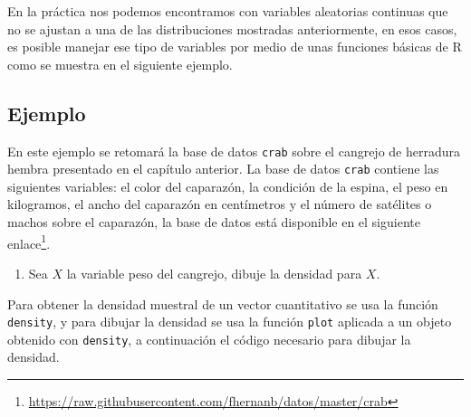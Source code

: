 \documentclass[10pt,]{krantz}
\makeatletter
\newenvironment{Shaded}{\begin{snugshade}}{\end{snugshade}}
\newcommand{\KeywordTok}[1]{\textcolor[rgb]{0.13,0.29,0.53}{\textbf{{#1}}}}
\newcommand{\DataTypeTok}[1]{\textcolor[rgb]{0.13,0.29,0.53}{{#1}}}
\newcommand{\DecValTok}[1]{\textcolor[rgb]{0.00,0.00,0.81}{{#1}}}
\newcommand{\StringTok}[1]{\textcolor[rgb]{0.31,0.60,0.02}{{#1}}}
\newcommand{\NormalTok}[1]{{#1}}
\providecommand{\tightlist}{%
  \setlength{\itemsep}{0pt}\setlength{\parskip}{0pt}}
\let\proglang=\textsf
\renewcommand{\href}[2]{#2\footnote{\url{#1}}}
\newenvironment{kframe}{%
\medskip{}
\setlength{\fboxsep}{.8em}
 \def\at@end@of@kframe{}%
 \ifinner\ifhmode%
  \def\at@end@of@kframe{\end{minipage}}%
  \begin{minipage}{\columnwidth}%
 \fi\fi%
 \def\FrameCommand##1{\hskip\@totalleftmargin \hskip-\fboxsep
 \colorbox{shadecolor}{##1}\hskip-\fboxsep
     \hskip-\linewidth \hskip-\@totalleftmargin \hskip\columnwidth}%
 \MakeFramed {\advance\hsize-\width
   \@totalleftmargin\z@ \linewidth\hsize
   \@setminipage}}%
 {\par\unskip\endMakeFramed%
 \at@end@of@kframe}
\renewenvironment{Shaded}{\begin{kframe}}{\end{kframe}}
\makeatother
\begin{document}
En la práctica nos podemos encontramos con variables aleatorias
continuas que no se ajustan a una de las distribuciones mostradas
anteriormente, en esos casos, es posible manejar ese tipo de variables
por medio de unas funciones básicas de \proglang{R} como se muestra en
el siguiente ejemplo.

\subsection*{Ejemplo}\label{ejemplo-48}


En este ejemplo se retomará la base de datos \texttt{crab} sobre el
cangrejo de herradura hembra presentado en el capítulo anterior. La base
de datos \texttt{crab} contiene las siguientes variables: el color del
caparazón, la condición de la espina, el peso en kilogramos, el ancho
del caparazón en centímetros y el número de satélites o machos sobre el
caparazón, la base de datos está disponible en el siguiente
\href{https://raw.githubusercontent.com/fhernanb/datos/master/crab}{enlace}.

\begin{enumerate}
\def\labelenumi{\arabic{enumi})}
\tightlist
\item
  Sea \(X\) la variable peso del cangrejo, dibuje la densidad para
  \(X\).
\end{enumerate}

Para obtener la densidad muestral de un vector cuantitativo se usa la
función \texttt{density}, y para dibujar la densidad se usa la función
\texttt{plot} aplicada a un objeto obtenido con \texttt{density}, a
continuación el código necesario para dibujar la densidad.

\begin{Shaded}
\end{Shaded}
\end{document}
